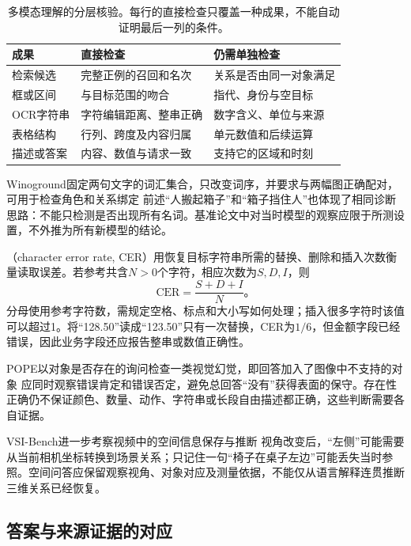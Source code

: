 \begin{table}[htbp]
  \centering
  \small
  \begin{tabularx}{\linewidth}{@{}p{19mm}XX@{}}
    \toprule
    成果 & 直接检查 & 仍需单独检查\\
    \midrule
    检索候选 & 完整正例的召回和名次 & 关系是否由同一对象满足\\
    框或区间 & 与目标范围的吻合 & 指代、身份与空目标\\
    OCR字符串 & 字符编辑距离、整串正确 & 数字含义、单位与来源\\
    表格结构 & 行列、跨度及内容归属 & 单元数值和后续运算\\
    描述或答案 & 内容、数值与请求一致 & 支持它的区域和时刻\\
    \bottomrule
  \end{tabularx}
  \caption{多模态理解的分层核验。每行的直接检查只覆盖一种成果，不能自动证明最后一列的条件。}
  \label{tab:vision-understanding-evaluation}
\end{table}
\FloatBarrier

Winoground固定两句文字的词汇集合，只改变词序，并要求与两幅图正确配对，可用于检查角色和关系绑定
前述“人搬起箱子”和“箱子挡住人”也体现了相同诊断思路：不能只检测是否出现所有名词。基准论文中对当时模型的观察应限于所测设置，不外推为所有新模型的结论。

（character error rate, CER）用恢复目标字符串所需的替换、删除和插入次数衡量读取误差。若参考共含$N>0$个字符，相应次数为$S,D,I$，则
\begin{equation}
  \mathrm{CER}=\frac{S+D+I}{N}\text{。}
  \label{eq:vision-cer}
\end{equation}
分母使用参考字符数，需规定空格、标点和大小写如何处理；插入很多字符时该值可以超过1。将“128.50”读成“123.50”只有一次替换，CER为$1/6$，但金额字段已经错误，因此业务字段还应报告整串或数值正确性。

POPE以对象是否存在的询问检查一类视觉幻觉，即回答加入了图像中不支持的对象
应同时观察错误肯定和错误否定，避免总回答“没有”获得表面的保守。存在性正确仍不保证颜色、数量、动作、字符串或长段自由描述都正确，这些判断需要各自证据。

VSI-Bench进一步考察视频中的空间信息保存与推断
视角改变后，“左侧”可能需要从当前相机坐标转换到场景关系；只记住一句“椅子在桌子左边”可能丢失当时参照。空间问答应保留观察视角、对象对应及测量依据，不能仅从语言解释连贯推断三维关系已经恢复。

\subsection{答案与来源证据的对应}
\label{sec:vision-understanding-grounded-evaluation}

